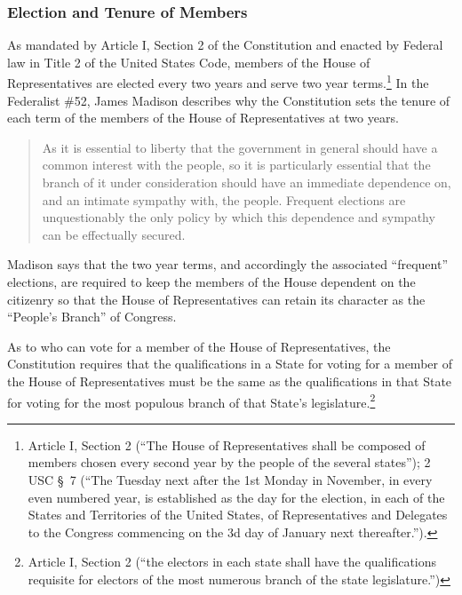 \subsubsection{Election and Tenure of Members}

As mandated by Article I, Section 2 of the Constitution and enacted by Federal law in Title 2 of the United States Code, members of the House of Representatives are elected every two years and serve two year terms.\footnote{Article I, Section 2 (``The House of Representatives shall be composed of members chosen every second year by the people of the several states''); 2 USC \S\ 7 (``The Tuesday next after the 1st Monday in November, in every even numbered year, is established as the day for the election, in each of the States and Territories of the United States, of Representatives and Delegates to the Congress commencing on the 3d day of January next thereafter.'').}  In the Federalist \#52, James Madison describes why the Constitution sets the tenure of each term of the members of the House of Representatives at two years.

\begin{quote}
As it is essential to liberty that the government in general should have a common interest with the people, so it is particularly essential that the branch of it under consideration should have an immediate dependence on, and an intimate sympathy with, the people. Frequent elections are unquestionably the only policy by which this dependence and sympathy can be effectually secured. 
\end{quote}

Madison says that the two year terms, and accordingly the associated ``frequent'' elections, are required to keep the members of the House dependent on the citizenry so that the House of Representatives can retain its character as the ``People's Branch'' of Congress.

As to who can vote for a member of the House of Representatives, the Constitution requires that the qualifications in a State for voting for a member of the House of Representatives must be the same as the qualifications in that State for voting for the most populous branch of that State's legislature.\footnote{Article I, Section 2 (``the electors in each state shall have the qualifications requisite for electors of the most numerous branch of the state legislature.'')}

